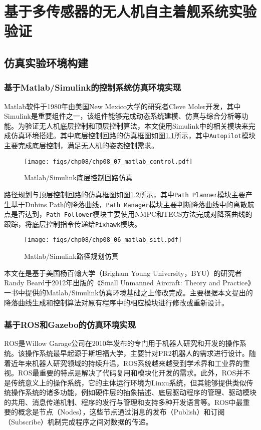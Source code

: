 \chapter{基于多传感器的无人机自主着舰系统实验验证}

\section{仿真实验环境构建}
\subsection{基于Matlab/Simulink的控制系统仿真环境实现}
Matlab软件于1980年由美国New Mexico大学的研究者Cleve Moler开发，其中Simulink是重要组件之一，该组件能够完成动态系统建模、仿真与综合分析等功能。为验证无人机底层控制和顶层控制算法，本文使用Simulink中的相关模块来完成仿真环境搭建。其中底层控制回路的仿真框图如图\ref{fig:chp08_07_matlab_control}所示，其中\texttt{Autopilot}模块主要完成底层控制，满足无人机的姿态控制需求。

\begin{figure}[!ht]
	\centering
	\texttt{[image: figs/chp08/chp08\_07\_matlab\_control.pdf]}	
	\caption{Matlab/Simulink底层控制回路仿真}
	\label{fig:chp08_07_matlab_control}
\end{figure}

路径规划与顶层控制回路的仿真框图如图\ref{fig:chp08_06_matlab_sitl}所示，其中\texttt{Path Planner}模块主要产生基于Dubins Path的降落曲线，\texttt{Path Manager}模块主要判断降落曲线中的离散航点是否达到，\texttt{Path Follower}模块主要使用NMPC和TECS方法完成对降落曲线的跟踪，将底层控制指令传递给\texttt{Pixhawk}模块。

\begin{figure}[!ht]
	\centering
	\texttt{[image: figs/chp08/chp08\_06\_matlab\_sitl.pdf]}	
	\caption{Matlab/Simulink路径规划仿真}
	\label{fig:chp08_06_matlab_sitl}
\end{figure}

本文在是基于美国杨百翰大学（Brigham Young University，BYU）的研究者Randy Beard于2012年出版的《Small Unmanned Aircraft: Theory and Practice》一书\cite{beard2012small}中提供的Matlab/Simulink仿真环境基础之上修改完成。主要根据本文提出的降落曲线生成和控制算法对原有程序中的相应模块进行修改或重新设计。

\subsection{基于ROS和Gazebo的仿真环境实现}
ROS是Willow Garage公司在2010年发布的专门用于机器人研究和开发的操作系统。该操作系统最早起源于斯坦福大学，主要针对PR2机器人的需求进行设计。随着近年来机器人研究领域的持续升温，ROS系统越来越受到学术界和工业界的重视。ROS最重要的特点是解决了代码复用和模块化开发的需求。此外，ROS并不是传统意义上的操作系统，它的主体运行环境为Linxu系统，但其能够提供类似传统操作系统的诸多功能，例如硬件层的抽象描述、底层驱动程序的管理、驱动模块的共用、消息传递机制、程序的发行与管理和支持多种开发语言等。ROS中最重要的概念是节点（Nodes），这些节点通过消息的发布（Publish）和订阅（Subscribe）机制完成程序之间对数据的传递。


